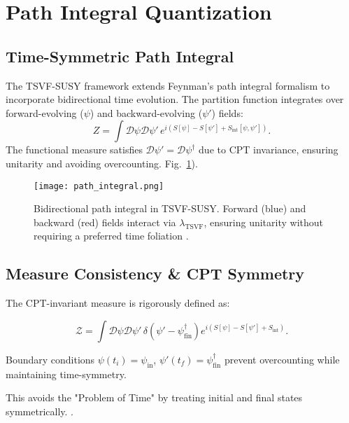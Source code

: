 \documentclass[twocolumn,superscriptaddress,floatfix]{revtex4-2}
\begin{document}
\section{Path Integral Quantization}  
\label{sec:path_integral}  

\subsection{Time-Symmetric Path Integral}
The TSVF-SUSY framework extends Feynman's path integral formalism to incorporate bidirectional time evolution. The partition function integrates over forward-evolving ($\psi$) and backward-evolving ($\psi'$) fields:
\begin{equation}
Z = \int \mathcal{D}\psi \mathcal{D}\psi' \, e^{i(S[\psi] - S[\psi'] + S_{\text{int}}[\psi, \psi'])}.
\end{equation}
The functional measure satisfies $\mathcal{D}\psi' = \mathcal{D}\psi^{\dagger}$ due to CPT invariance, ensuring unitarity and avoiding overcounting. Fig.~\ref{fig:path_integral}).  

\begin{figure}[htbp]  
\centering  
\texttt{[image: path\_integral.png]}  
\caption{Bidirectional path integral in TSVF-SUSY. Forward (blue) and backward (red) fields interact via \(\lambda_{\text{TSVF}}\), ensuring unitarity without requiring a preferred time foliation \cite{Isham1992}.}  
\label{fig:path_integral}  
\end{figure}  

\subsection{Measure Consistency \& CPT Symmetry}  
\label{sec:measure}  

The CPT-invariant measure is rigorously defined as:  

\begin{equation}  
\mathcal{Z} = \int \mathcal{D}\psi\mathcal{D}\psi' \, \delta(\psi' - \psi_{\text{fin}}^\dagger) e^{i(S[\psi] - S[\psi'] + S_{\text{int}})}.  
\end{equation}  

Boundary conditions $\psi(t_i) = \psi_{\text{in}}$, $\psi'(t_f) = \psi_{\text{fin}}^\dagger$ prevent overcounting while maintaining time-symmetry.  

This avoids the "Problem of Time" by treating initial and final states symmetrically. \cite{DeWitt1967}.  
\end{document}
